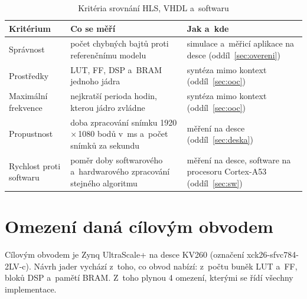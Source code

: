 \begin{table}[htbp]
    \centering
    \caption{Kritéria srovnání HLS, VHDL a~softwaru}
    \label{tab:kriteria}
    \begin{tabular}{p{3.3cm}p{5.2cm}p{5.2cm}}
        \toprule
        Kritérium & Co se měří & Jak a~kde \\
        \midrule
        Správnost & počet chybných bajtů proti referenčnímu modelu & simulace a~měřicí aplikace na desce (oddíl~\ref{sec:overeni}) \\
        Prostředky & \acs{LUT}, \acs{FF}, \acs{DSP} a~\acs{BRAM} jednoho jádra & syntéza mimo kontext (oddíl~\ref{sec:ooc}) \\
        Maximální frekvence & nejkratší perioda hodin, kterou jádro zvládne & syntéza mimo kontext (oddíl~\ref{sec:ooc}) \\
        Propustnost & doba zpracování snímku 1920\,×\,1080 bodů v~ms a~počet snímků za sekundu & měření na desce (oddíl~\ref{sec:deska}) \\
        Rychlost proti softwaru & poměr doby softwarového a~hardwarového zpracování stejného algoritmu & měření na desce, software na procesoru Cortex-A53 (oddíl~\ref{sec:sw}) \\
        \bottomrule
    \end{tabular}
\end{table}

\section{Omezení daná cílovým obvodem}
\label{sec:obvod}

Cílovým obvodem je Zynq UltraScale+ na desce KV260 (označení xck26-sfvc784-2LV-c). Návrh jader vychází z~toho, co obvod nabízí: z~počtu buněk \acs{LUT} a~\acs{FF}, bloků \acs{DSP} a~pamětí \acs{BRAM}. Z~toho plynou 4 omezení, kterými se řídí všechny implementace.


